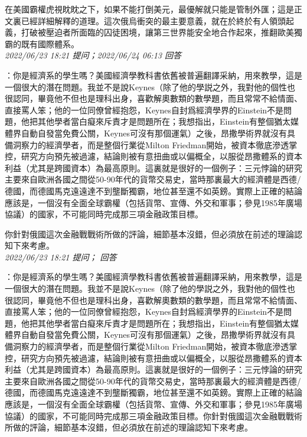 \documentclass[twocolumn]{ctexart}
\begin{document}
在美國霸權虎視眈眈之下，如果不能打倒美元，最優解就只能是管制外匯；這是正文裏已經詳細解釋的道理。這次俄烏衝突的最主要意義，就在於終於有人領頭起義，打破被壓迫者所面臨的囚徒困境，讓第三世界能安全地合作起來，推翻歐美獨霸的既有國際體系。
\\

\textit{\hfill\noindent\small 2022/06/23 18:21 提问；2022/06/24 06:13 回答}

：你是經濟系的學生嗎？美國經濟學教科書依舊被普遍翻譯采納，用來教學，這是一個很大的潛在問題。我並不是說Keynes（除了他的學説之外，我對他的個性也很認同，畢竟他不但也是理科出身，喜歡解奧數類的數學題，而且常常不給情面、直接罵人笨；他的一位同僚曾經抱怨，Keynes自封爲經濟學界的Einstein不是問題，他把其他學者當白癡來斥責才是問題所在；我想指出，Einstein有整個猶太媒體界自動自發當免費公關，Keynes可沒有那個運氣）之後，昂撒學術界就沒有具備洞察力的經濟學者，而是整個行業從Milton Friedman開始，被資本徹底滲透掌控，研究方向預先被過濾，結論則被有意扭曲或以偏概全，以服從昂撒體系的資本利益（尤其是跨國資本）為最高原則。這裏就是很好的一個例子：三元悖論的研究主要來自歐洲各國之間從50-90年代的貨幣交易史，當時那裏最大的經濟體是西德/德國，而德國馬克遠遠達不到壟斷獨霸，地位甚至還不如英鎊。實際上正確的結論應該是，一個沒有全面全球霸權（包括貨幣、宣傳、外交和軍事；參見1985年廣場協議）的國家，不可能同時完成那三項金融政策目標。

你針對俄國這次金融戰戰術所做的評論，細節基本沒錯，但必須放在前述的理論認知下來考慮。
\\

\textit{\hfill\noindent\small 2022/06/23 18:21 提问； 回答}

：你是經濟系的學生嗎？美國經濟學教科書依舊被普遍翻譯采納，用來教學，這是一個很大的潛在問題。我並不是說Keynes（除了他的學説之外，我對他的個性也很認同，畢竟他不但也是理科出身，喜歡解奧數類的數學題，而且常常不給情面、直接罵人笨；他的一位同僚曾經抱怨，Keynes自封爲經濟學界的Einstein不是問題，他把其他學者當白癡來斥責才是問題所在；我想指出，Einstein有整個猶太媒體界自動自發當免費公關，Keynes可沒有那個運氣）之後，昂撒學術界就沒有具備洞察力的經濟學者，而是整個行業從Milton Friedman開始，被資本徹底滲透掌控，研究方向預先被過濾，結論則被有意扭曲或以偏概全，以服從昂撒體系的資本利益（尤其是跨國資本）為最高原則。這裏就是很好的一個例子：三元悖論的研究主要來自歐洲各國之間從50-90年代的貨幣交易史，當時那裏最大的經濟體是西德/德國，而德國馬克遠遠達不到壟斷獨霸，地位甚至還不如英鎊。實際上正確的結論應該是，一個沒有全面全球霸權（包括貨幣、宣傳、外交和軍事；參見1985年廣場協議）的國家，不可能同時完成那三項金融政策目標。你針對俄國這次金融戰戰術所做的評論，細節基本沒錯，但必須放在前述的理論認知下來考慮。\\
\end{document}
